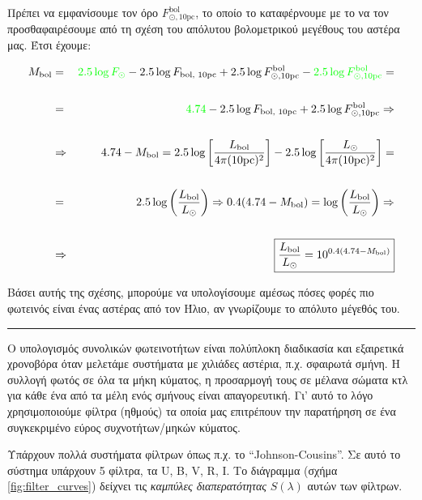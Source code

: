 Πρέπει να εμφανίσουμε τον όρο $F_{\odot, \text{10pc}}^{\text{bol}}$, το οποίο το καταφέρνουμε με το να τον προσθαφαιρέσουμε από τη σχέση του απόλυτου βολομετρικού μεγέθους του αστέρα μας. Έτσι έχουμε:

\begin{eqnarray*}
    M_{\text{bol}} &=& {\color{green} 2.5 \log F_{\odot}} - 2.5 \log F_{\text{bol, 10pc}} + 2.5 \log F_{\odot, \text{10pc}}^{\text{bol}} - {\color{green} 2.5 \log F_{\odot, \text{10pc}}^{\text{bol}}} = \\\\
    &=& {\color{green}4.74} - 2.5 \log F_{\text{bol, 10pc}} + 2.5 \log F_{\odot, \text{10pc}}^{\text{bol}} \Rightarrow \\\\
    &\Rightarrow & 4.74 - M_{\text{bol}} = 2.5 \log \left[ \frac{L_{\text{bol}}}{4\pi (\text{10pc})^2} \right] - 2.5 \log \left[ \frac{L_{\odot}}{4\pi (\text{10pc})^2} \right] = \\\\
    &=& 2.5 \log \left( \frac{L_{\text{bol}}}{L_{\odot}} \right) \Rightarrow 0.4(4.74 - M_{\text{bol}}) = \log \left( \frac{L_{\text{bol}}}{L_{\odot}} \right) \Rightarrow \\\\
    &\Rightarrow & \boxed{\frac{L_{\text{bol}}}{L_{\odot}} = 10^{0.4(4.74 - M_{\text{bol}})}}
\end{eqnarray*}

Βάσει αυτής της σχέσης, μπορούμε να υπολογίσουμε αμέσως πόσες φορές πιο φωτεινός είναι ένας αστέρας από τον Ήλιο, αν γνωρίζουμε το απόλυτο μέγεθός του. \\
\hrule 

Ο υπολογισμός συνολικών φωτεινοτήτων είναι πολύπλοκη διαδικασία και εξαιρετικά χρονοβόρα όταν μελετάμε συστήματα με χιλιάδες αστέρια, π.χ. σφαιρωτά σμήνη. Η συλλογή φωτός σε όλα τα μήκη κύματος, η προσαρμογή τους σε μέλανα σώματα κτλ για κάθε ένα από τα μέλη ενός σμήνους είναι απαγορευτική.
Γι' αυτό το λόγο χρησιμοποιούμε φίλτρα (ηθμούς) τα οποία μας επιτρέπουν την παρατήρηση σε ένα συγκεκριμένο εύρος συχνοτήτων/μηκών κύματος.

Υπάρχουν πολλά συστήματα φίλτρων όπως π.χ. το ``Johnson-Cousins''. Σε αυτό το σύστημα υπάρχουν 5 φίλτρα, τα U, B, V, R, I. Το διάγραμμα (σχήμα \ref{fig:filter_curves}) δείχνει τις \textit{καμπύλες διαπερατότητας} $S(\lambda)$ αυτών των φίλτρων.

